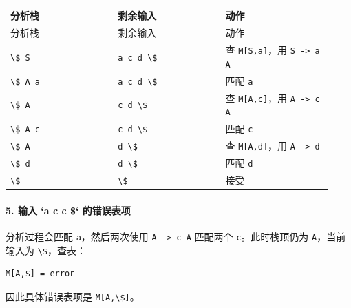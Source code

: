 \documentclass[UTF8]{ctexart}
\begin{document}
\begin{longtable}{|p{0.31\linewidth}|p{0.31\linewidth}|p{0.31\linewidth}|}
\hline
分析栈 & 剩余输入 & 动作 \\
\hline
\endfirsthead
分析栈 & 剩余输入 & 动作 \\
\hline
\endhead
\texttt{\textbackslash{}\$ S} & \texttt{a c d \textbackslash{}\$} & 查 \texttt{M[S,a]}，用 \texttt{S -> a A} \\
\hline
\texttt{\textbackslash{}\$ A a} & \texttt{a c d \textbackslash{}\$} & 匹配 \texttt{a} \\
\hline
\texttt{\textbackslash{}\$ A} & \texttt{c d \textbackslash{}\$} & 查 \texttt{M[A,c]}，用 \texttt{A -> c A} \\
\hline
\texttt{\textbackslash{}\$ A c} & \texttt{c d \textbackslash{}\$} & 匹配 \texttt{c} \\
\hline
\texttt{\textbackslash{}\$ A} & \texttt{d \textbackslash{}\$} & 查 \texttt{M[A,d]}，用 \texttt{A -> d} \\
\hline
\texttt{\textbackslash{}\$ d} & \texttt{d \textbackslash{}\$} & 匹配 \texttt{d} \\
\hline
\texttt{\textbackslash{}\$} & \texttt{\textbackslash{}\$} & 接受 \\
\hline
\end{longtable}

\paragraph*{5. 输入 `a c c \$` 的错误表项}

分析过程会匹配 \texttt{a}，然后两次使用 \texttt{A -> c A} 匹配两个 \texttt{c}。此时栈顶仍为 \texttt{A}，当前输入为 \texttt{\textbackslash{}\$}，查表：

\begin{Verbatim}[fontsize=\small,breaklines=true]
M[A,$] = error
\end{Verbatim}

因此具体错误表项是 \texttt{M[A,\textbackslash{}\$]}。
\end{document}
